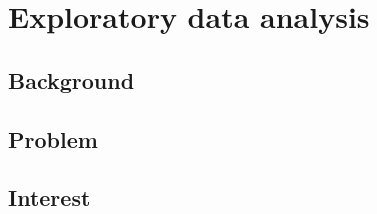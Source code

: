 {\justifying
	\chapter{Exploratory data analysis}
	\vspace{2.5cm}
	\section{Background}
	\section{Problem}
	\section{Interest}
}\cleanalldata